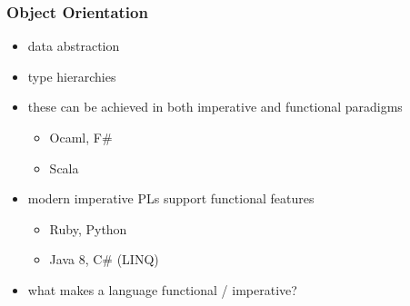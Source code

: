 \documentclass[dvipsnames]{beamer}
\theoremstyle{plain}
\begin{document}
\begin{frame}
  \frametitle{Object Orientation}

  \begin{itemize}
    \item data abstraction
    \item type hierarchies

    \pause
    \medskip
    \item these can be achieved in both imperative and functional paradigms
    \begin{itemize}
      \item Ocaml, F\#
      \item Scala
    \end{itemize}

    \pause
    \bigskip
    \item modern imperative PLs support functional features
    \begin{itemize}
      \item Ruby, Python
      \item Java 8, C\# (LINQ)
    \end{itemize}

    \pause
    \bigskip
    \item what makes a language functional / imperative?
  \end{itemize}
\end{frame}
% 
% 
% 
\end{document}
